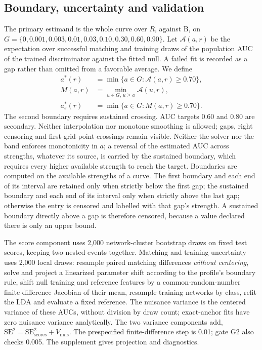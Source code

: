 \subsection{Boundary, uncertainty and validation}

The primary estimand is the whole curve over $R$, against B, on $G=\{0,0.001,0.003,0.01,0.03,0.10,0.30,0.60,0.90\}$. %
Let $\mathcal A(a,r)$ be the expectation over successful matching and training draws of the population AUC of the trained discriminator against the fitted null. %
A failed fit is recorded as a gap rather than omitted from a favorable average. %
We define
\begin{align}
a^*(r)&=\min\{a\in G:\mathcal A(a,r)\geq0.70\},\\
M(a,r)&=\min_{u\in G,\,u\geq a}\mathcal A(u,r),\\
a_s^*(r)&=\min\{a\in G:M(a,r)\geq0.70\}.
\end{align}
The second boundary requires sustained crossing. %
AUC targets 0.60 and 0.80 are secondary. %
Neither interpolation nor monotone smoothing is allowed; gaps, right censoring and first-grid-point crossings remain visible. %
Neither the solver nor the band enforces monotonicity in $a$; a reversal of the estimated AUC across strengths, whatever its source, is carried by the sustained boundary, which requires every higher available strength to reach the target. %
Boundaries are computed on the available strengths of a curve. %
The first boundary and each end of its interval are retained only when strictly below the first gap; the sustained boundary and each end of its interval only when strictly above the last gap; otherwise the entry is censored and labelled with that gap's strength. %
A sustained boundary directly above a gap is therefore censored, because a value declared there is only an upper bound. %

The score component uses 2,000 network-cluster bootstrap draws on fixed test scores, keeping two nested events together. %
Matching and training uncertainty uses 2,000 local draws: resample paired matching differences \emph{without centering}, solve and project a linearized parameter shift according to the profile's boundary rule, shift null training and reference features by a common-random-number finite-difference Jacobian of their mean, resample training networks by class, refit the LDA and evaluate a fixed reference. %
The nuisance variance is the centered variance of these AUCs, without division by draw count; exact-anchor fits have zero nuisance variance analytically. %
The two variance components add, $\mathrm{SE}^2=\mathrm{SE}_{\mathrm{scores}}^2+V_{\mathrm{nuis}}$. %
The prespecified finite-difference step is 0.01; gate G2 also checks 0.005. %
The supplement gives projection and diagnostics. %

